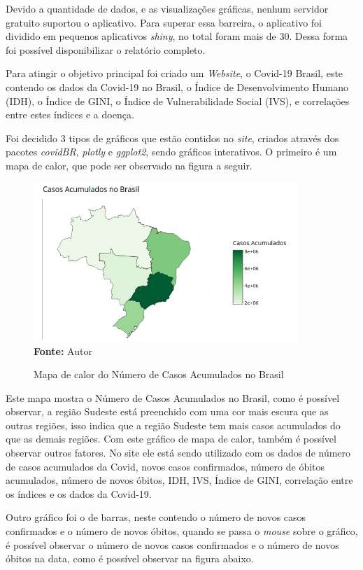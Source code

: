 \documentclass[
  fleqn,ebook]{ic}
\begin{document}
Devido a quantidade de dados, e as visualizações gráficas, nenhum servidor
gratuito suportou o aplicativo. Para superar essa barreira, o aplicativo
foi dividido em pequenos aplicativos \emph{shiny}, no total foram mais de 30. Dessa
forma foi possível disponibilizar o relatório completo.

Para atingir o objetivo principal foi criado um \emph{Website}, o Covid-19 Brasil,
este contendo os dados da Covid-19 no Brasil, o Índice de Desenvolvimento Humano
(IDH), o Índice de GINI, o Índice de Vulnerabilidade Social (IVS), e
correlações entre estes índices e a doença.

Foi decidido 3 tipos de gráficos que estão contidos no \emph{site}, criados através
dos pacotes \emph{covidBR}, \emph{plotly} e \emph{ggplot2}, sendo gráficos interativos. O
primeiro é um mapa de calor, que pode ser observado na figura a seguir.

\begin{figure}[H]
    \centering
    \caption{Mapa de calor do Número de Casos Acumulados no Brasil}
    \includegraphics[width=10cm]{img/mapa.png} \\
    {\footnotesize \textbf{Fonte: }Autor}
    \label{fig:mapa}
\end{figure}

Este mapa mostra o Número de Casos Acumulados no Brasil, como é possível
observar, a região Sudeste está preenchido com uma cor mais escura que as outras
regiões, isso indica que a região Sudeste tem mais casos acumulados do que as
demais regiões. Com este gráfico de mapa de calor, também é possível observar
outros fatores. No site ele está sendo utilizado com os dados de número de casos
acumulados da Covid, novos casos confirmados, número de óbitos acumulados,
número de novos óbitos, IDH, IVS, Índice de GINI, correlação entre os índices e
os dados da Covid-19.

Outro gráfico foi o de barras, neste contendo o número de novos casos
confirmados e o número de novos óbitos, quando se passa o \emph{mouse} sobre o
gráfico, é possível observar o número de novos casos confirmados e o número de
novos óbitos na data, como é possível observar na figura abaixo.
\end{document}
